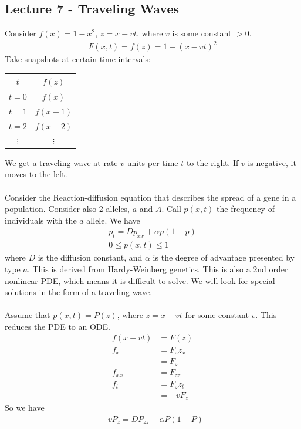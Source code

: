 \documentclass[12pt, letterpaper]{article}
\begin{document}
\subsection{Lecture 7 - Traveling Waves}
 Consider $f(x) = 1- x^2$, $z = x -vt$, where $v$ is some constant
$> 0$.
\begin{align*}
    F(x,t) = f(z) = 1 - (x - vt)^2
\end{align*}
Take snapshots at certain time intervals:
\begin{center}
    \begin{tabular}{c | c} 
        $t$ & $f(z)$ \\
        \hline
        $t = 0$ & $f(x)$ \\
        $t = 1$ & $f(x-1)$ \\
        $t = 2$ & $f(x-2)$ \\
        $\vdots$ & $\vdots$ 
    \end{tabular}
\end{center}
We get a traveling wave at rate $v$ units per time $t$ to the right. If $v$ is 
negative, it moves to the left. \\ \\ 
Consider the Reaction-diffusion equation that describes the spread of a gene 
in a population. Consider also 2 alleles, $a$ and $A$. Call $p(x,t)$ the frequency
of individuals with the $a$ allele. We have 
\begin{align*}
    p_t = Dp_{xx} + \alpha p(1-p) \\
    0 \le p(x,t) \le 1
\end{align*}
where $D$ is the diffusion constant, and $\alpha$ is the degree of advantage 
presented by type $a$. This is derived from Hardy-Weinberg genetics. This is also 
a 2nd order nonlinear PDE, which means it is difficult to solve. We will look for 
special solutions in the form of a traveling wave. \\ \\
Assume that $p(x,t) = P(z)$, where $z = x- vt$ for some constant $v$. This reduces 
the PDE to an ODE.
\begin{align*}
    f(x-vt) &= F(z) \\
    f_x &= F_z z_x \\
    &= F_z \\
    f_{xx} &= F_{zz} \\
    f_t &= F_z z_t \\
    &= -v F_z
\end{align*}
So we have 
\begin{align*}
    -v P_z = D P_{zz} + \alpha P (1-P)
\end{align*}
\end{document}
